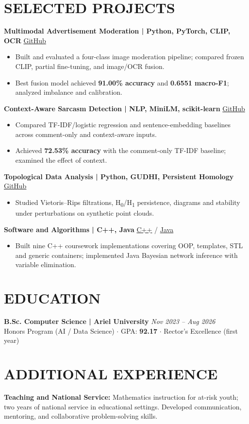 \documentclass[10pt,a4paper]{article}
\begin{document}
\section*{SELECTED PROJECTS}
\textbf{Multimodal Advertisement Moderation \quad | \quad Python, PyTorch, CLIP, OCR} \hfill \href{https://github.com/naamaskital/sVLM_ads_project}{GitHub}
\begin{itemize}
\item Built and evaluated a four-class image moderation pipeline; compared frozen CLIP, partial fine-tuning, and image/OCR fusion.
\item Best fusion model achieved \textbf{91.00\% accuracy} and \textbf{0.6551 macro-F1}; analyzed imbalance and calibration.
\end{itemize}
\textbf{Context-Aware Sarcasm Detection \quad | \quad NLP, MiniLM, scikit-learn} \hfill \href{https://github.com/naamaskital/sarcasm_context_project}{GitHub}
\begin{itemize}
\item Compared TF-IDF/logistic regression and sentence-embedding baselines across comment-only and context-aware inputs.
\item Achieved \textbf{72.53\% accuracy} with the comment-only TF-IDF baseline; examined the effect of context.
\end{itemize}
\textbf{Topological Data Analysis \quad | \quad Python, GUDHI, Persistent Homology} \hfill \href{https://github.com/naamaskital/topological-data-analysis}{GitHub}
\begin{itemize}
\item Studied Vietoris--Rips filtrations, H\textsubscript{0}/H\textsubscript{1} persistence, diagrams and stability under perturbations on synthetic point clouds.
\end{itemize}
\textbf{Software and Algorithms \quad | \quad C++, Java} \hfill \href{https://github.com/naamaskital/cpp-programming-projects}{C++} / \href{https://github.com/naamaskital/bayesian-network-inference-java}{Java}
\begin{itemize}
\item Built nine C++ coursework implementations covering OOP, templates, STL and generic containers; implemented Java Bayesian network inference with variable elimination.
\end{itemize}
\section*{EDUCATION}
\textbf{B.Sc. Computer Science \quad | \quad Ariel University} \hfill \textit{Nov 2023 -- Aug 2026}\\
Honors Program (AI / Data Science) \quad $\cdot$ \quad GPA: \textbf{92.17} \quad $\cdot$ \quad Rector's Excellence (first year)
\section*{ADDITIONAL EXPERIENCE}
\textbf{Teaching and National Service:} Mathematics instruction for at-risk youth; two years of national service in educational settings. Developed communication, mentoring, and collaborative problem-solving skills.
\end{document}
